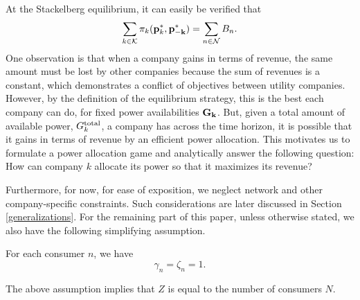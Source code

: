 At the Stackelberg equilibrium, it can easily be verified that  
\begin{equation}\sum_{k\in {\cal K}}\pi_k({\bf{p}}^*_k,{\bf{p}^*_{-k}})=\sum_{n\in {\cal N}}B_n.\label{eq1}\end{equation}
One observation is that when a company gains in terms of revenue, the same amount must be lost by other companies because the sum of revenues is a constant, which demonstrates a conflict of objectives between utility companies. However, by the definition of the equilibrium strategy, this is the best each company can do, for fixed power availabilities ${\bf G_k}$. But, given a total amount of available power, $G^{{\rm total}}_k$, a company has across the time horizon, it is possible that it gains in terms of revenue by an efficient power allocation. This motivates us to formulate a power allocation game and analytically answer the following question: How can company $k$ allocate its power so that it maximizes its revenue? {\color{black} Furthermore, for now, for ease of exposition, we neglect network and other company-specific constraints. Such considerations are later discussed in Section \ref{generalizations}.  For the remaining part of this paper, unless otherwise stated, we also have the following simplifying assumption.

\begin{assumption}
For each consumer $n$, we have $$\gamma_n=\zeta_n=1.$$ \label{assumption2}
\end{assumption}

The above assumption implies that $Z$ is equal to the number of consumers $N$.}


